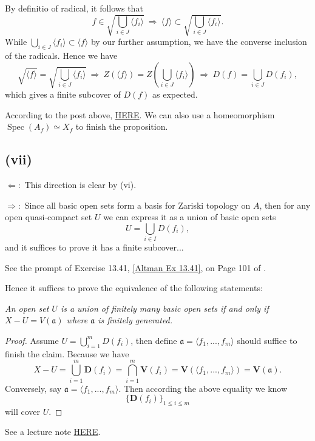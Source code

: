 By definitio of radical, it follows that 
$$f\in \sqrt{\bigcup_{i\in J}\langle f_i\rangle} ~\Rightarrow~ \langle f\rangle \subset \sqrt{\bigcup_{i\in J}\langle f_i\rangle}.$$ While $\bigcup_{i\in J}\langle f_i\rangle\subset \langle f\rangle$ by our further assumption, we have the converse inclusion of the radicals. 
Hence we have 
$$\sqrt{\langle f\rangle}=\sqrt{\bigcup_{i\in J}\langle f_i\rangle} ~\Rightarrow~ Z(\langle f\rangle)=Z(\bigcup_{i\in J}\langle f_i\rangle) ~\Rightarrow~ D(f)=\bigcup_{i\in J}D(f_i),$$ which gives a finite subcover of $D(f)$ as expected.

According to the post above, \href{https://math.stackexchange.com/questions/1175478/basic-open-sets-in-the-zariski-topology-are-also-compact}{HERE}. We can also use a homeomorphism $\operatorname{Spec}(A_f)\simeq X_f$ to finish the proposition. 
\subsection{(vii)}
$\Leftarrow:$ This direction is clear by (vi).
 
$\Rightarrow:$ Since all basic open sets form a basis for Zariski topology on $A$, then for any open quasi-compact set $U$ we can express it as a union of basic open sets 
$$U=\bigcup_{i\in I}D(f_{i}),$$ and it suffices to prove it has a finite subcover... 

\smallskip
\medskip

See the prompt of Exercise 13.41, \ref{Altman Ex 13.41}, on Page 101 of \cite{altman}. 
\smallskip

Hence it suffices to prove the equivalence of the following statements:\newline

\textit{An open set $U$ is a union of finitely many basic open sets if and only if $X-U=V(\mathfrak a)$ where $\mathfrak a$ is finitely generated.}
\begin{proof}
Assume $U=\bigcup_{i=1}^m D(f_i)$, then define $\mathfrak a=\langle f_1,...,f_m\rangle$ should suffice to finish the claim. Because we have 
\[X-U=\bigcup_{i=1}^m \mathbf D(f_i)=\bigcap_{i=1}^m \mathbf V(f_i)=\mathbf V(\langle f_1,...,f_m\rangle)=\mathbf V(\mathfrak a).\]
Conversely, say $\mathfrak a=\langle f_1,...,f_m\rangle$. Then according the above equality we know \[\{\mathbf D(f_i)\}_{1\leq i\leq m}\] will cover $U$.
\end{proof}
See a lecture note \href{https://math.stanford.edu/~conrad/Perfseminar/Notes/L3.pdf}{HERE}.



